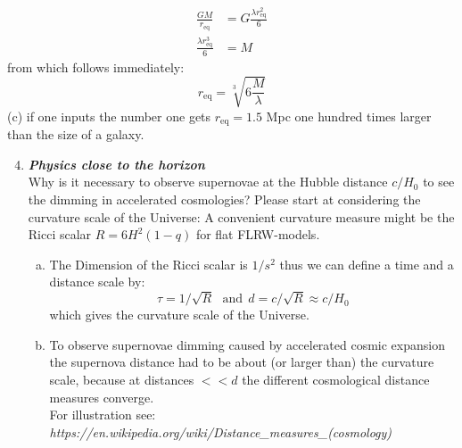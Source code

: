 \documentclass[a4paper,12pt]{article}
\newcommand{\question}[1]{\textbf{\textit{#1}}}
\begin{document}
		\begin{align}
		  \frac{GM}{r_\textrm{eq}}&=G\frac{\lambda r_\textrm{eq}^2}{6}\\
		  \frac{\lambda r_\textrm{eq}^3}{6}&=M
		\end{align}
		from which follows immediately:
		\begin{equation}
		  r_\textrm{eq}=\sqrt[3]{6\frac{M}{\lambda}}
		\end{equation}
		(c) if one inputs the number one gets $ r_\textrm{eq}
                =1.5$ Mpc one hundred times larger than the size of a galaxy.
        \begin{enumerate}
        \setcounter{enumi}{3}
		\item \question{Physics close to the horizon}\\
		Why is it necessary to observe supernovae at the Hubble distance $c/H_0$ to see the dimming in accelerated cosmologies? Please start at considering the curvature scale of the Universe: A convenient curvature measure might be the Ricci scalar $R = 6H^2(1-q)$ for flat FLRW-models.
		\begin{enumerate}[(a)]
			\item The Dimension of the Ricci scalar is $1/s^2$ thus we can define a time and a distance scale by:
			$$ \tau = 1/\sqrt{R} \ \ \ \mathrm{and} \ \ d = c/\sqrt{R} \approx c/H_0$$
			which gives the curvature scale of the Universe. 
			\item To observe supernovae dimming caused by accelerated cosmic expansion the supernova distance had to be about (or larger than) the curvature scale, because at distances $<<d$ the different cosmological distance measures converge. \\
			For illustration see: \textit{https://en.wikipedia.org/wiki/Distance\_measures\_(cosmology)}
		\end{enumerate}
		

\end{enumerate}
\end{document}
